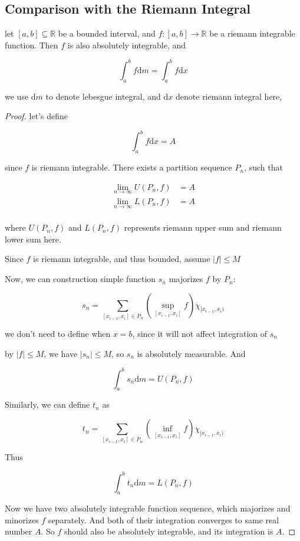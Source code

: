 \subsection{Comparison with the Riemann Integral}

\begin{thm}
    let $[a,b] \subseteq \mathbb{R}$ be a bounded interval, and $f: [a,b] \to \mathbb{R}$
    be a riemann integrable function. Then $f$ is also absolutely integrable,
    and

    \[
        \int_a^b f \mathrm{d}m = \int_a^b f \mathrm{d}x
    \]

    we use $\mathrm{d}m$ to denote lebesgue integral, and $\mathrm{d}x$ denote riemann integral here,
\end{thm}

\begin{proof}
    let's define

    \[
        \int_a^b f \mathrm{d}x = A
    \]

    since $f$ is riemann integrable. There exists a partition sequence $P_n$, such that

    \begin{align*}
        \lim_{n \to \infty}U(P_n, f)  &= A \\
        \lim_{n \to \infty} L(P_n, f) & =  A \\
    \end{align*}

    where $U(P_n, f)$ and $L(P_n, f)$ represents riemann upper sum and riemann lower sum here.

    Since $f$ is riemann integrable, and thus bounded, assume $|f| \le M$

    Now, we can construction simple function $s_n$ majorizes $f$ by $P_n$:

    \[
        s_n = \sum_{[x_{i-1},x_i] \in P_n} \left(\sup_{[x_{i-1}, x_{i}]} f \right) \chi_{[x_{i-1}, x_i)}
    \]

    we don't need to define when $x = b$, since it will not affect integration of $s_n$

    by $|f| \le M$, we have $|s_n| \le M$, so $s_n$ is 
    absolutely measurable.  And

    \[
        \int_{a}^b s_n \mathrm{d}m = U(P_n, f)
    \]

    Similarly, we can define $t_n$ as


    \[
        t_n = \sum_{[x_{i-1},x_i] \in P_n} \left(\inf_{[x_{i-1}, x_{i}]} f \right) \chi_{[x_{i-1}, x_i)} 
    \]

    Thus


    \[
        \int_{a}^b t_n \mathrm{d}m = L(P_n, f)
    \]

    Now we have two absolutely integrable function sequence, which majorizes and minorizes $f$ separately.
    And both of their integration converges to same real number $A$. So $f$ should also 
    be absolutely integrable, and its integration is $A$.

\end{proof}

